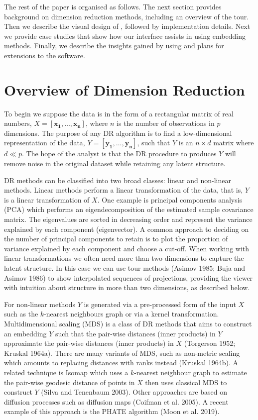 \documentclass[article,notitle]{jdssv}
\begin{document}
The rest of the paper is organised as follows. The next section provides
background on dimension reduction methods, including an overview of the tour.
Then we describe the visual design of , followed by implementation
details. Next we provide case studies that show how our interface assists
in using embedding methods. Finally, we describe the insights gained by using
 and plans for extensions to the software.

\hypertarget{overview-of-dimension-reduction}{%
\section{Overview of Dimension Reduction}\label{overview-of-dimension-reduction}}

To begin we suppose the data is in the form of a rectangular
matrix of real numbers, \(X = [\mathbf{x_1}, \dots, \mathbf{x_n}]\), where \(n\) is
the number of observations in \(p\) dimensions. The purpose of any DR algorithm
is to find a low-dimensional representation of the data,
\(Y = [\mathbf{y_1}, \dots, \mathbf{y_n}]\), such that \(Y\) is an \(n \times d\)
matrix where \(d \ll p\). The hope of the analyst is that the DR procedure to
produces \(Y\) will remove noise in the original dataset while retaining any
latent structure.

DR methods can be classified into two broad classes: linear and non-linear
methods. Linear methods perform a linear transformation of the data, that is,
\(Y\) is a linear transformation of \(X\). One example is principal components
analysis (PCA) which performs an eigendecomposition of the estimated sample
covariance matrix. The eigenvalues are sorted in decreasing order and represent
the variance explained by each component (eigenvector).
A common approach to deciding on the number of principal components to retain is
to plot the proportion of variance explained by each component and choose a
cut-off.
When working with linear transformations we often need more than two dimensions
to capture the latent structure. In this case we can use tour methods
(Asimov 1985; Buja and Asimov 1986) to show interpolated sequences of projections,
providing the viewer with intuition about structure in more than two
dimensions, as described below.

For non-linear methods \(Y\) is generated via a pre-processed form of the input
\(X\) such as the \(k\)-nearest neighbours graph or via a kernel transformation.
Multidimensional scaling (MDS) is a class of DR methods that aims to construct
an embedding \(Y\) such that the pair-wise distances (inner products) in \(Y\)
approximate the pair-wise distances (inner products) in \(X\)
(Torgerson 1952; Kruskal 1964a). There are many
variants of MDS, such as non-metric scaling which amounts to replacing
distances with ranks instead (Kruskal 1964b).
A related technique is Isomap which uses a \(k\)-nearest neighbour graph
to estimate the pair-wise geodesic distance of points in \(X\) then uses classical
MDS to construct \(Y\) (Silva and Tenenbaum 2003). Other approaches are based on diffusion
processes such as diffusion maps (Coifman et al. 2005). A recent example of this
approach is the PHATE algorithm (Moon et al. 2019).
\end{document}
